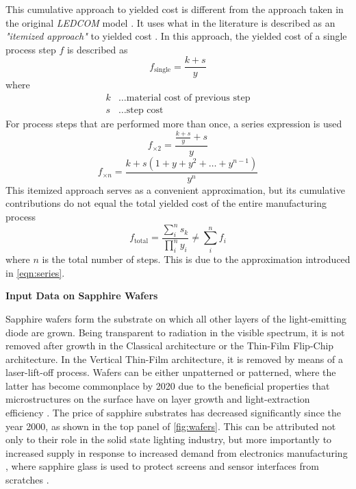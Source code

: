 \documentclass[parskip=full]{article}
\begin{document}
%
This cumulative approach to yielded cost is different from the approach taken in the original \textit{LEDCOM} model \cite{ledcomv2}. It uses what in the literature is described as an \textit{"itemized approach"} to yielded cost \cite{becker2001use}. In this approach, the yielded cost of a single process step $f$ is described as
%
\begin{equation}
    f_\text{single} = \frac{k+s}{y}
\end{equation}
%
where
%
\begin{align*}
    k &\dots \text{material cost of previous step} \\
    s &\dots \text{step cost}
\end{align*}
%
For process steps that are performed more than once, a series expression is used
%
\begin{equation}
    f_{\times 2} =  \frac{\frac{k+s}{y}+s}{y}
\end{equation}
\begin{equation}
\label{eqn:series}
    f_{\times n} = \frac{k + s(1+y+y^2+ \dots + y^{n-1})}{y^n}
\end{equation}
%
This itemized approach serves as a convenient approximation, but its cumulative contributions do not equal the total yielded cost of the entire manufacturing process
%
\begin{equation}
    f_\text{total} = \frac{\sum_i^n s_k}{\prod_i^n y_i} \neq \sum_i^n f_i
\end{equation}
%
where $n$ is the total number of steps. This is due to the approximation introduced in \cref{eqn:series}.

\textbf{Input Data on Sapphire Wafers}

Sapphire wafers form the substrate on which all other layers of the light-emitting diode are grown. Being transparent to radiation in the visible spectrum, it is not removed after growth in the Classical architecture or the Thin-Film Flip-Chip architecture. In the Vertical Thin-Film architecture, it is removed by means of a laser-lift-off process. Wafers can be either unpatterned or patterned, where the latter has become commonplace by 2020 due to the beneficial properties that microstructures on the surface have on layer growth \cite{wuu2009defect} and light-extraction efficiency \cite{lee2006enhancing}. The price of sapphire substrates has decreased significantly since the year 2000, as shown in the top panel of \cref{fig:wafers}. This can be attributed not only to their role in the solid state lighting industry, but more importantly to increased supply in response to increased demand from electronics manufacturing \cite{yole2015sapphire}, where sapphire glass is used to protect screens and sensor interfaces from scratches \cite{khattak2016world}.
\end{document}
